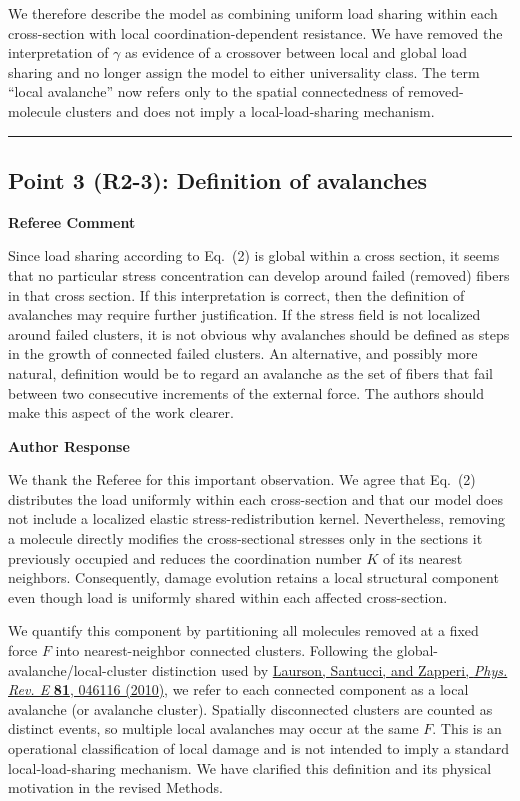 \documentclass[11pt]{article}
\newenvironment{refereecomment}
  {%
    \par
    \begingroup
    \color{commentgray}
    \itshape
    \setlength{\leftskip}{1.4em}
    \setlength{\rightskip}{1.4em}
  }
  {%
    \par
    \endgroup
  }
\newcommand{\refereelabel}{%
  \par\smallskip
  {\color{commentgray}\bfseries Referee Comment}\par
}
\newcommand{\responselabel}{%
  \par\medskip
  {\color{responseblue}\bfseries Author Response}\par
}
\newcommand{\pointseparator}{%
  \par\bigskip
  {\color{rulegray}\hrule}
  \par\bigskip
}
\begin{document}
We therefore describe the model as combining uniform load sharing within each
cross-section with local coordination-dependent resistance. We have removed
the interpretation of \(\gamma\) as evidence of a crossover between local and
global load sharing and no longer assign the model to either universality
class. The term ``local avalanche'' now refers only to the spatial connectedness
of removed-molecule clusters and does not imply a local-load-sharing mechanism.

\pointseparator

\subsection*{Point 3 (R2-3): Definition of avalanches}

\refereelabel
\begin{refereecomment}
Since load sharing according to Eq.~(2) is global within a cross section, it
seems that no particular stress concentration can develop around failed
(removed) fibers in that cross section. If this interpretation is correct,
then the definition of avalanches may require further justification. If the
stress field is not localized around failed clusters, it is not obvious why
avalanches should be defined as steps in the growth of connected failed
clusters. An alternative, and possibly more natural, definition would be to
regard an avalanche as the set of fibers that fail between two consecutive
increments of the external force. The authors should make this aspect of the
work clearer.
\end{refereecomment}

\responselabel
We thank the Referee for this important observation. We agree that Eq.~(2)
distributes the load uniformly within each cross-section and that our model
does not include a localized elastic stress-redistribution kernel.
Nevertheless, removing a molecule directly modifies the cross-sectional
stresses only in the sections it previously occupied and reduces the
coordination number \(K\) of its nearest neighbors. Consequently, damage
evolution retains a local structural component even though load is uniformly
shared within each affected cross-section.

We quantify this component by partitioning all molecules removed at a fixed
force \(F\) into nearest-neighbor connected clusters. Following the
global-avalanche/local-cluster distinction used by
\href{https://doi.org/10.1103/PhysRevE.81.046116}{Laurson, Santucci, and
Zapperi, \textit{Phys. Rev. E} \textbf{81}, 046116 (2010)}, we refer to each
connected component as a local avalanche (or avalanche cluster). Spatially
disconnected clusters are counted as distinct events, so multiple local
avalanches may occur at the same \(F\). This is an operational classification
of local damage and is not intended to imply a standard local-load-sharing
mechanism. We have clarified this definition and its physical motivation in
the revised Methods.
\end{document}
